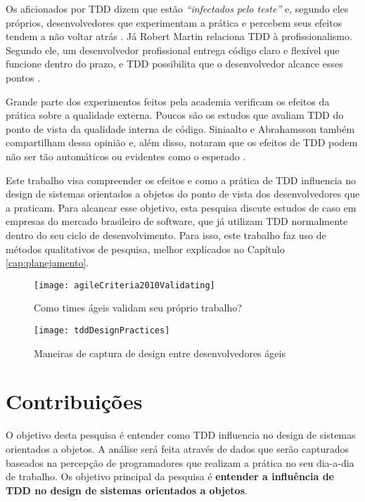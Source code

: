 Os aficionados por TDD dizem que estão \textit{``infectados pelo teste''}  e,
segundo eles próprios, desenvolvedores que experimentam a prática e percebem
seus efeitos tendem a não voltar atrás \cite{tdd-fearless}.
Já Robert Martin relaciona TDD à profissionalismo. Segundo ele, um desenvolvedor
profissional entrega código claro e flexível que funcione dentro do prazo, e TDD
possibilita que o desenvolvedor alcance esses pontos \cite{martin-profissionalismo}.

Grande parte dos experimentos feitos pela academia verificam os efeitos da
prática sobre a qualidade externa. Poucos são os estudos que avaliam TDD do
ponto de vista da qualidade interna de código. Siniaalto e Abrahamsson também 
compartilham dessa opinião e, além disso, notaram que os efeitos de TDD podem 
não ser tão automáticos ou evidentes como o esperado \cite{alarming-results}.

Este trabalho visa compreender os efeitos e como a prática de TDD
influencia no design de sistemas orientados a objetos do ponto de vista dos
desenvolvedores que a praticam. Para alcancar esse objetivo,
esta pesquisa discute estudos de caso em empresas do mercado brasileiro de
software, que já utilizam TDD normalmente dentro do seu ciclo de
desenvolvimento. Para isso, este trabalho faz uso de métodos qualitativos de
pesquisa, melhor explicados no Capítulo \ref{cap:planejamento}.

\begin{figure}[ht]
  \begin{minipage}[b]{0.45\linewidth}
    \centering
    \texttt{[image: agileCriteria2010Validating]}
    \caption{Como times ágeis validam seu próprio trabalho?}
    \label{fig:wambler-agile-2010}
  \end{minipage}
  \hspace{0.5cm}
  \begin{minipage}[b]{0.45\linewidth}
    \centering
    \texttt{[image: tddDesignPractices]}
    \caption{Maneiras de captura de design entre desenvolvedores ágeis}  
    \label{fig:wambler-tdd-2008}
  \end{minipage}
\end{figure}			

\section{Contribuições}

O objetivo desta pesquisa é entender como TDD influencia no design de sistemas
orientados a objetos. A análise será feita através de dados que serão
capturados baseados na percepção de programadores que realizam a prática no seu
dia-a-dia de trabalho.
Os objetivo principal da pesquisa é \textbf{entender a influência de TDD no
design de sistemas orientados a objetos}.

